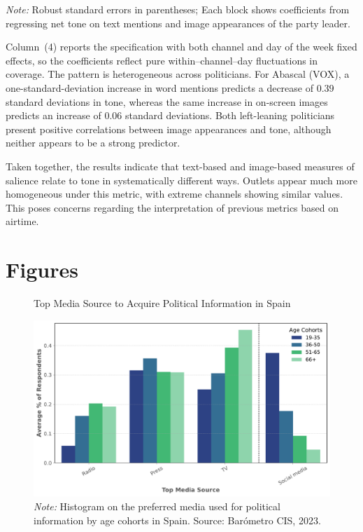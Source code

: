 \documentclass[12pt]{article}
\begin{document}
\begin{table}[htbp!]
	\vspace{0.5em}
	\begin{flushleft}
		\scriptsize\emph{Note:} Robust standard errors in parentheses;\quad 
		Each block shows coefficients from regressing net tone on text mentions and image appearances of the party leader.
	\end{flushleft}
\end{table}



Column~(4) reports the specification with both channel and day of the week fixed effects, so the coefficients reflect pure within–channel–day fluctuations in coverage. The pattern is heterogeneous across politicians. For Abascal (VOX), a one-standard-deviation increase in word mentions predicts a decrease of $0.39$ standard deviations in tone, whereas the same increase in on-screen images predicts an increase of $0.06$ standard deviations. Both left-leaning politicians present positive correlations between image appearances and tone, although neither appears to be a strong predictor.

Taken together, the results indicate that text-based and image-based measures of salience relate to tone in systematically different ways. Outlets appear much more homogeneous under this metric, with extreme channels showing similar values. This poses concerns regarding the interpretation of previous metrics based on airtime.




\clearpage


\section{Figures}
	
	
	
	\begin{figure}[!htbp]
		\centering
		\caption{Top Media Source to Acquire Political Information in Spain}
		\includegraphics[width=130mm]{figures/age_cohorts}
		\caption*{\small \textit{Note:} Histogram on the preferred media used for political information by age cohorts in Spain.  
			Source: Barómetro CIS, 2023. }
		\label{fig:motivation}
	\end{figure}
	
\end{document}
